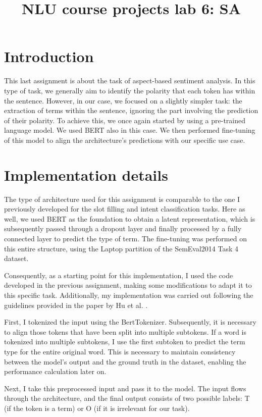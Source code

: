 \documentclass[a4paper]{article}
\title{NLU course projects lab 6: SA}
\begin{document}
\maketitle

\section{Introduction}
This last assignment is about the task of aspect-based sentiment analysis.
In this type of task, we generally aim to identify the polarity that each token has within the sentence. However, in our case, we focused on a slightly simpler task: the extraction of terms within the sentence, ignoring the part involving the prediction of their polarity.
To achieve this, we once again started by using a pre-trained language model. We used BERT also in this case. We then performed fine-tuning of this model to align the architecture’s predictions with our specific use case.

\section{Implementation details}
The type of architecture used for this assignment is comparable to the one I previously developed for the slot filling and intent classification tasks.
Here as well, we used BERT as the foundation to obtain a latent representation, which is subsequently passed through a dropout layer and finally processed by a fully connected layer to predict the type of term. The fine-tuning was performed on this entire structure, using the Laptop partition of the SemEval2014 Task 4 dataset.

Consequently, as a starting point for this implementation, I used the code developed in the previous assignment, making some modifications to adapt it to this specific task.
Additionally, my implementation was carried out following the guidelines provided in the paper by Hu et al. \cite{hu2019opendomaintargetedsentimentanalysis}.

First, I tokenized the input using the BertTokenizer. Subsequently, it is necessary to align those tokens that have been split into multiple subtokens. If a word is tokenized into multiple subtokens, I use the first subtoken to predict the term type for the entire original word. This is necessary to maintain consistency between the model’s output and the ground truth in the dataset, enabling the performance calculation later on.

Next, I take this preprocessed input and pass it to the model. The input flows through the architecture, and the final output consists of two possible labels: T (if the token is a term) or O (if it is irrelevant for our task).
\end{document}
